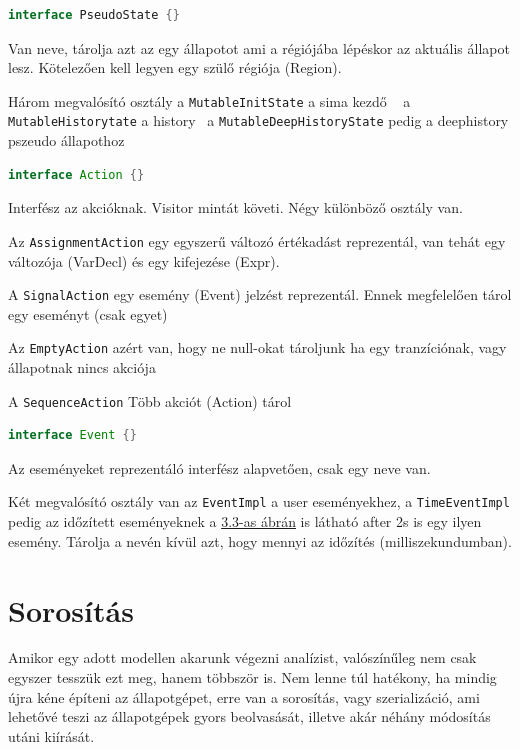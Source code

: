 \begin{lstlisting}[language=java,breaklines=true]
interface PseudoState {}
\end{lstlisting}

Van neve, tárolja azt az egy állapotot ami a régiójába lépéskor az aktuális állapot lesz. Kötelezően kell legyen egy szülő régiója (Region).

Három megvalósító osztály a \verb+MutableInitState+ a sima kezdő ~ a \verb+MutableHistorytate+ a history~ a \verb+MutableDeepHistoryState+ pedig a deephistory pszeudo állapothoz

\begin{lstlisting}[language=java,breaklines=true]
interface Action {}
\end{lstlisting}

Interfész az akcióknak. Visitor mintát követi. Négy különböző osztály van. 

Az \verb+AssignmentAction+ egy egyszerű változó értékadást reprezentál, van tehát egy változója (VarDecl) és egy kifejezése (Expr).

A \verb+SignalAction+ egy esemény (Event) jelzést reprezentál. Ennek megfelelően tárol egy eseményt (csak egyet)

Az \verb+EmptyAction+ azért van, hogy ne null-okat tároljunk ha egy tranzíciónak, vagy állapotnak nincs akciója

A \verb+SequenceAction+ Több akciót (Action) tárol

\begin{lstlisting}[language=java,breaklines=true]
interface Event {}
\end{lstlisting}

Az eseményeket reprezentáló interfész alapvetően, csak egy neve van.

Két megvalósító osztály van az \verb+EventImpl+ a user eseményekhez, a \verb+TimeEventImpl+ pedig az időzített eseményeknek a \hyperref[fig:statechart]{3.3-as ábrán} is látható after 2s is egy ilyen esemény. Tárolja a nevén kívül azt, hogy mennyi az időzítés (milliszekundumban).


\section{Sorosítás}

Amikor egy adott modellen akarunk végezni analízist, valószínűleg nem csak egyszer tesszük ezt meg, hanem többször is. Nem lenne túl hatékony, ha mindig újra kéne építeni az állapotgépet, erre van a sorosítás, vagy szerializáció, ami lehetővé teszi az állapotgépek gyors beolvasását, illetve akár néhány módosítás utáni kiírását.

